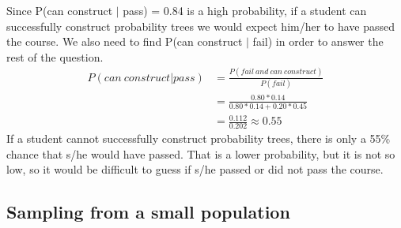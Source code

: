 
{
Since P(can construct $|$ pass) = 0.84 is a high probability, if a student can successfully construct probability trees we would expect him/her to have passed the course. We also need to find P(can construct $|$ fail) in order to answer the rest of the question.
\begin{align*}
P(can~construct | pass) &= \frac{P(fail~and~can~construct)}{P(fail)} \\
&= \frac{0.80 * 0.14}{0.80 * 0.14 + 0.20 * 0.45} \\
&= \frac{0.112}{0.202} \approx 0.55
\end{align*}
If a student cannot successfully construct probability trees, there is only a 55\% chance that s/he would have passed. That is a lower probability, but it is not so low, so it would be difficult to guess if s/he passed or did not pass the course.}


\subsection{Sampling from a small population}


